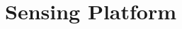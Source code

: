 \documentclass{erauthesis}
\begin{document}
\chapter{Sensing Platform} \label{sensing_platform}




\end{document}
